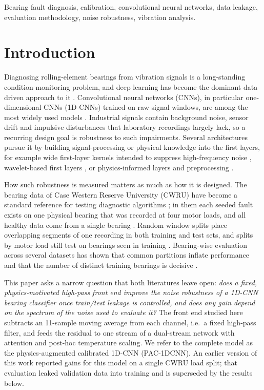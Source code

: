\documentclass[conference]{IEEEtran}
\begin{document}
\begin{IEEEkeywords}
Bearing fault diagnosis, calibration, convolutional neural networks, data leakage, evaluation methodology, noise robustness, vibration analysis.
\end{IEEEkeywords}

\section{Introduction}
Diagnosing rolling-element bearings from vibration signals is a long-standing condition-monitoring problem, and deep learning has become the dominant data-driven approach to it \cite{hakim2023review,tama2023review}. Convolutional neural networks (CNNs), in particular one-dimensional CNNs (1D-CNNs) trained on raw signal windows, are among the most widely used models \cite{zhang2017wdcnn,hakim2023review}. Industrial signals contain background noise, sensor drift and impulsive disturbances that laboratory recordings largely lack, so a recurring design goal is robustness to such impairments. Several architectures pursue it by building signal-processing or physical knowledge into the first layers, for example wide first-layer kernels intended to suppress high-frequency noise \cite{zhang2017wdcnn}, wavelet-based first layers \cite{li2022wkn,wang2023mwcnn,li2024wpconvnet}, or physics-informed layers and preprocessing \cite{ni2023piresnet,kim2023tfmd}.

How such robustness is measured matters as much as how it is designed. The bearing data of Case Western Reserve University (CWRU) \cite{cwrudata} have become a standard reference for testing diagnostic algorithms \cite{smith2015cwru}; in them each seeded fault exists on one physical bearing that was recorded at four motor loads, and all healthy data come from a single bearing \cite{abburi2023closer,rosa2024multilabel}. Random window splits place overlapping segments of one recording in both training and test sets, and splits by motor load still test on bearings seen in training \cite{hendriks2022cwru,abburi2023closer,rosa2024multilabel}. Bearing-wise evaluation across several datasets has shown that common partitions inflate performance and that the number of distinct training bearings is decisive \cite{vieira2026realistic}.

This paper asks a narrow question that both literatures leave open: \emph{does a fixed, physics-motivated high-pass front end improve the noise robustness of a 1D-CNN bearing classifier once train/test leakage is controlled, and does any gain depend on the spectrum of the noise used to evaluate it?} The front end studied here subtracts an 11-sample moving average from each channel, i.e.\ a fixed high-pass filter, and feeds the residual to one stream of a dual-stream network with attention and post-hoc temperature scaling. We refer to the complete model as the physics-augmented calibrated 1D-CNN (PAC-1DCNN). An earlier version of this work reported gains for this model on a single CWRU load split; that evaluation leaked validation data into training and is superseded by the results below.
\end{document}
